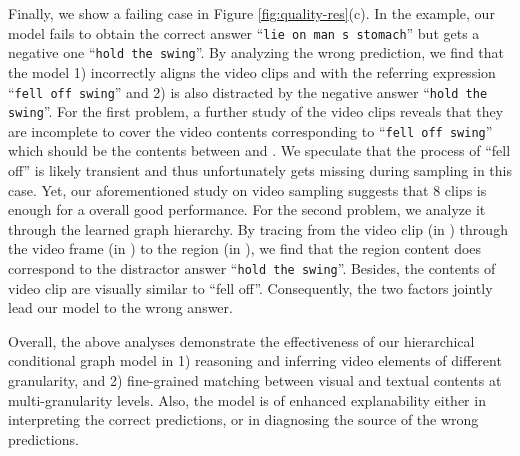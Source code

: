 \documentclass[letterpaper]{article} \usepackage{aaai21}  \usepackage{times}  \usepackage{helvet} \usepackage{courier}  \usepackage[hyphens]{url}  \usepackage{graphicx} \urlstyle{rm} \def\UrlFont{\rm}  \usepackage{natbib}  \usepackage{caption} \usepackage{color, colortbl}
\begin{document}
Finally, we show a failing case in Figure \ref{fig:quality-res}(c). In the example, our model fails to obtain the correct answer ``\texttt{lie on man s stomach}'' but gets a negative one ``\texttt{hold the swing}''. By analyzing the wrong prediction, we find that the model 1) incorrectly aligns the video clips  and  with the referring expression ``\texttt{fell off swing}'' and 2) is also distracted by the negative answer ``\texttt{hold the swing}''. For the first problem, a further study of the video clips reveals that they are incomplete to cover the video contents corresponding to ``\texttt{fell off swing}'' which should be the contents between  and . We speculate that the process of ``fell off'' is likely transient and thus unfortunately gets missing during sampling in this case. Yet, our aforementioned study on video sampling suggests that 8 clips is enough for a overall good performance. For the second problem, we analyze it through the learned graph hierarchy. By tracing from the video clip  (in ) through the video frame  (in ) to the region  (in ), we find that the region content  does correspond to the distractor answer ``\texttt{hold the swing}''. Besides, the contents of video clip  are visually similar to ``fell off''. Consequently, the two factors jointly lead our model to the wrong answer.

Overall, the above analyses demonstrate the effectiveness of our hierarchical conditional graph model in 1) reasoning and inferring video elements of different granularity, and 2) fine-grained matching between visual and textual contents at multi-granularity levels. Also, the model is of enhanced explanability either in interpreting the correct predictions, or in diagnosing the source of the wrong predictions.

\begin{figure*}[t!]
 \centering
 \caption{Visualization of question-answering results in NExT-QA \cite{xiao2021next}. The ground-truth answers and our predictions are highlighted in \textbf{bold} and \underline{underline} respectively.  \textcolor{blue}{Blue}: Self-attention weights . \textcolor{orange}{Orange}: weights of adjacency matrix  and query condition . (Please zoom in for better view of the object bounding boxes.)}
 \label{fig:quality-res}
 \vspace{-1.0em}
\end{figure*} \clearpage
\pagebreak
\end{document}
